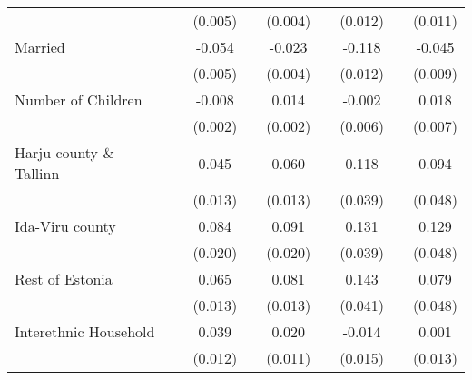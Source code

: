 \begin{sidewaystable}
\begin{tabular}{l*{2}{c}| *{2}{c}| *{2}{c}| *{2}{c}}
	&                     &     (0.005)         &                     &     (0.004)         &                     &     (0.012)         &                     &     (0.011)         \\
	Married             &                     &      -0.054\sym{***}&                     &      -0.023\sym{***}&                     &      -0.118\sym{***}&                     &      -0.045\sym{***}\\
	&                     &     (0.005)         &                     &     (0.004)         &                     &     (0.012)         &                     &     (0.009)         \\
	Number of Children  &                     &      -0.008\sym{***}&                     &       0.014\sym{***}&                     &      -0.002         &                     &       0.018\sym{**} \\
	&                     &     (0.002)         &                     &     (0.002)         &                     &     (0.006)         &                     &     (0.007)         \\
	Harju county \& Tallinn&                     &       0.045\sym{***}&                     &       0.060\sym{***}&                     &       0.118\sym{**} &                     &       0.094\sym{*}  \\
	&                     &     (0.013)         &                     &     (0.013)         &                     &     (0.039)         &                     &     (0.048)         \\
	Ida-Viru county   &                     &       0.084\sym{***}&                     &       0.091\sym{***}&                     &       0.131\sym{***}&                     &       0.129\sym{**} \\
	&                     &     (0.020)         &                     &     (0.020)         &                     &     (0.039)         &                     &     (0.048)         \\
	Rest of Estonia   &                     &       0.065\sym{***}&                     &       0.081\sym{***}&                     &       0.143\sym{***}&                     &       0.079         \\
	&                     &     (0.013)         &                     &     (0.013)         &                     &     (0.041)         &                     &     (0.048)         \\
	Interethnic Household&                     &       0.039\sym{***}&                     &       0.020         &                     &      -0.014         &                     &       0.001         \\
	&                     &     (0.012)         &                     &     (0.011)         &                     &     (0.015)         &                     &     (0.013)         \\



\end{tabular}
\end{sidewaystable}
